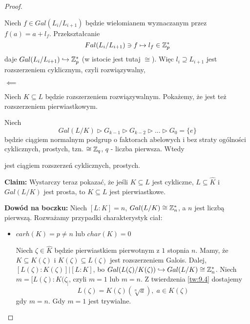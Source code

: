 \begin{proof}
\begin{itemize}
    Niech $f\in Gal(L_i/L_{i+1})$ będzie wielomianem wyznaczanym przez $f(a)=a+l_f$. Przekształcanie
    $$Fal(L_i/L_{i+1})\ni f\mapsto l_f\in \mathbb{Z}_p^*$$
    daje $Gal(L_i/L_{i+1})\hookrightarrow\mathbb{Z}_p^*$ (w istocie jest tutaj $\cong$). Więc $l_i\supseteq L_{i+1}$ jest rozszerzeniem cyklicznym, czyli rozwiązywalny,
\end{itemize}

$\impliedby$

Niech $K\subseteq L$ będzie rozszerzeniem rozwiązywalnym. Pokażemy, że jest też rozszerzeniem pierwiastkowym.

Niech
$$Gal(L/K)\triangleright G_{k-1}\triangleright G_{k-2}\triangleright...\triangleright G_0=\{e\}$$
będzie ciągiem normalnym podgrup o faktorach abelowych i bez straty ogólności cyklicznych, prostych, tzn. $\cong\mathbb{Z}_q$, $q$ - liczba pierwsza. Wtedy
\begin{center}\end{center}
jest ciągiem rozszerzeń cyklicznych, prostych.

\textbf{Claim:} Wystarczy teraz pokazać, że jeśli $K\subseteq L$ jest cykliczne, $L\subseteq\hat{K}$ i $Gal(L/K)$ jest prosta, to $K\subseteq L$ jest pierwiastkowe.

\textbf{Dowód na boczku:} Niech $[L:K]=n$, $Gal(L/K)\cong\mathbb{Z}_n^*$, a $n$ jest liczbą pierwszą. Rozważamy przypadki charakterystyk ciał:
\begin{itemize}
    \item $carh(K)=p\neq n$ lub $char(K)=0$

    Niech $\zeta\in\hat{K}$ będzie pierwiastkiem pierwotnym z $1$ stopnia $n$. Mamy, że $K\subseteq K(\zeta)$ i $K(\zeta)\subseteq L(\zeta)$ jest rozszerzeniem Galois. Dalej, $[L(\zeta):K(\zeta)]|[L:K]$, bo $Gal(L(\zeta)/K(\zeta))\hookrightarrow Gal(L/K)\cong\mathbb{Z}_n^*$. Niech $m=[L(\zeta):K(\zeta_]$, czyli $m=1$ lub $m=n$. Z twierdzenia \ref{tw:9.4} dostajemy
    $$L(\zeta)=K(\zeta)(\sqrt[n]{a}),\;a\in K(\zeta)$$
    gdy $m=n$. Gdy $m=1$ jest trywialne.
\end{itemize}
\end{proof}
